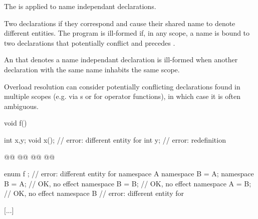 \documentclass{wg21}
\begin{document}
{\begin{addedblock}
The   is applied to name independant declarations.

\end{addedblock}

Two declarations 
if they correspond and
cause their shared name to denote different entities.
The program is ill-formed
if, in any scope, a name is bound to two declarations 
that potentially conflict and  precedes  .

\begin{addedblock}
\begin{note}
An  that denotes a name independant declaration is ill-formed when another declaration with the same name inhabits the same scope.
\end{note}
\end{addedblock}


\begin{note}
	Overload resolution can consider potentially conflicting declarations
	found in multiple scopes
	(e.g. via s or for operator functions),
	in which case it is often ambiguous.
\end{note}
\begin{example}
	\begin{codeblock}
		void f() {
			int x,y;
			void x();             // error: different entity for 
			int y;                  // error: redefinition

                        @@
			@@
                        @@
			@@
		}
		enum { f };             // error: different entity for 
		namespace A {}
		namespace B = A;
		namespace B = A;        // OK, no effect
		namespace B = B;        // OK, no effect
		namespace A = B;        // OK, no effect
		namespace B {}          // error: different entity for 
	\end{codeblock}
\end{example}

\textcolor{noteclr}{[...]}

}
\end{document}
